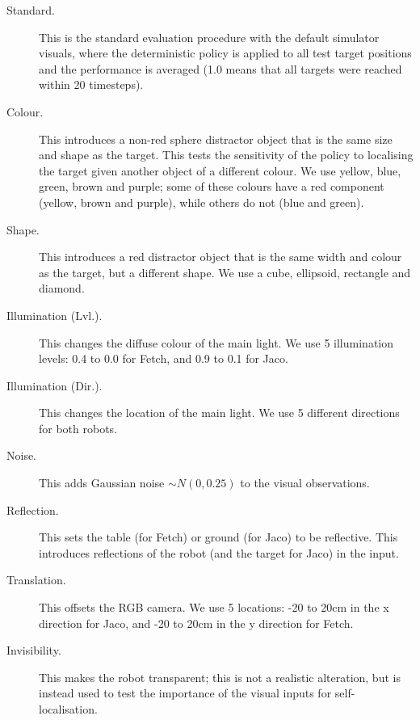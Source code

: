 \begin{description}
\item[Standard.] This is the standard evaluation procedure with the default simulator visuals, where the deterministic policy is applied to all test target positions and the performance is averaged (1.0 means that all targets were reached within 20 timesteps). 
\item[Colour.] This introduces a non-red sphere distractor object that is the same size and shape as the target. This tests the sensitivity of the policy to localising the target given another object of a different colour. We use yellow, blue, green, brown and purple; some of these colours have a red component (yellow, brown and purple), while others do not (blue and green).
\item[Shape.] This introduces a red distractor object that is the same width and colour as the target, but a different shape. We use a cube, ellipsoid, rectangle and diamond.
\item[Illumination (Lvl.).] This changes the diffuse colour of the main light. We use 5 illumination levels: 0.4 to 0.0 for Fetch, and 0.9 to 0.1 for Jaco.
\item[Illumination (Dir.).] This changes the location of the main light. We use 5 different directions for both robots. 
\item[Noise.] This adds Gaussian noise $\sim N(0, 0.25)$ to the visual observations. 
\item[Reflection.] This sets the table (for Fetch) or ground (for Jaco) to be reflective. This introduces reflections of the robot (and the target for Jaco) in the input.
\item[Translation.] This offsets the RGB camera. We use 5 locations: -20 to 20cm in the x direction for Jaco, and -20 to 20cm in the y direction for Fetch.
\item[Invisibility.] This makes the robot transparent; this is not a realistic alteration, but is instead used to test the importance of the visual inputs for self-localisation.
\end{description}

